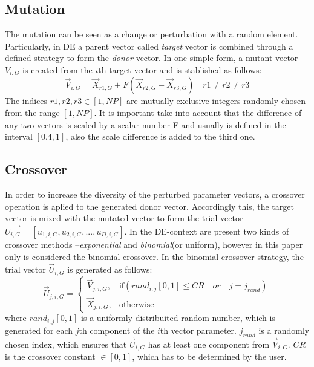 \subsection{Mutation}
The mutation can be seen as a change or perturbation with a random element.
%
Particularly, in DE a parent vector called \textit{target} vector is combined through a defined strategy to form the \textit{donor} vector.
%
In one simple form, a mutant vector $V_{i,G}$ is created from the $i$th target vector and is stablished as follows:
\begin{equation}
\vec{V}_{i,G} = \vec{X}_{r1, G} + F(\vec{X}_{r2, G} - \vec{X}_{r3, G}) \quad r1 \neq r2 \neq r3
\end{equation}
%
The indices $r1, r2, r3 \in [1,NP]$ are mutually exclusive integers randomly chosen from the range $[1, NP]$.
%
It is important take into account that the difference of any two vectors is scaled by a scalar number F and usually is defined in the interval $[0.4, 1]$, also the scale difference is added to the third one.
%

\subsection{Crossover}

In order to increase the diversity of the perturbed parameter vectors, a crossover operation is aplied to the generated donor vector.
%
Accordingly this, the target vector is mixed with the mutated vector to form the trial vector $\vec{U_{i,G}} = [u_{1,i,G},u_{2,i,G}, ..., u_{D,i,G} ]$.
%
In the DE-context are present two kinds of crossover methods --\textit{exponential} and \textit{binomial}(or uniform), however in this paper only is considered the binomial crossover.
%
In the binomial crossover strategy, the trial vector $\vec{U}_{i,G}$ is generated as follows:
%
\begin{equation}
\vec{U}_{j,i,G}= 
\begin{cases}
    \vec{V}_{j,i,G},& \text{if} (rand_{i,j}[0,1] \leq CR \quad or \quad j = j_{rand}  )\\
    \vec{X}_{j,i,G},              & \text{otherwise}
\end{cases}
\end{equation}
where $rand_{i,j}[0,1]$ is a uniformly distribuited random number, which is generated for each $j$th component of the $i$th vector parameter.
%
$j_{rand}$ is a randomly chosen index, which ensures that $\vec{U}_{i,G}$ has at least one component from $\vec{V}_{i,G}$.
%
$CR$ is the crossover constant $\in [0,1]$, which has to be determined by the user.


